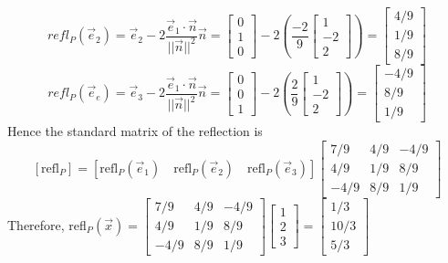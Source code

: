 \documentclass[10pt,letter]{article}
\begin{document}
$$refl_P(\vec{e}_2)=\vec{e}_2-2\frac{\vec{e}_1\cdot\vec{n}}{||\vec{n}||^2}\vec{n}=\begin{bmatrix}0\\1\\0\end{bmatrix}-2\left(\frac{-2}{9}\begin{bmatrix}1\\-2\\2\end{bmatrix}\right)=\begin{bmatrix}4/9\\1/9\\8/9\end{bmatrix}$$
$$refl_P(\vec{e}_e)=\vec{e}_3-2\frac{\vec{e}_1\cdot\vec{n}}{||\vec{n}||^2}\vec{n}=\begin{bmatrix}0\\0\\1\end{bmatrix}-2\left(\frac{2}{9}\begin{bmatrix}1\\-2\\2\end{bmatrix}\right)=\begin{bmatrix}-4/9\\8/9\\1/9\end{bmatrix}$$
Hence the standard matrix of the reflection is $$[\text{refl}_P]=[\text{refl}_P(\vec{e}_1)\quad \text{refl}_P(\vec{e}_2)\quad \text{refl}_P(\vec{e}_3)]\begin{bmatrix}7/9&4/9&-4/9\\4/9&1/9&8/9\\-4/9&8/9&1/9\end{bmatrix}$$ 
Therefore, refl$_P(\vec{x})=\begin{bmatrix}7/9&4/9&-4/9\\4/9&1/9&8/9\\-4/9&8/9&1/9\end{bmatrix}\begin{bmatrix}1\\2\\3\end{bmatrix}=\begin{bmatrix}1/3\\10/3\\5/3\end{bmatrix}$
\end{document}
